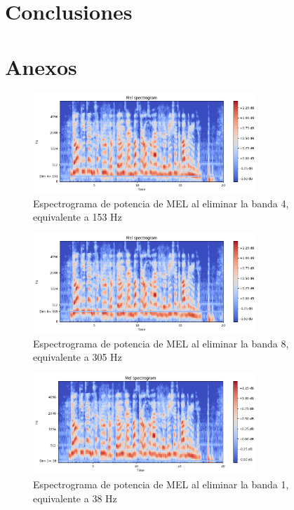 \documentclass[conference]{IEEEtran}
\begin{document}
\section{Conclusiones} \label{8-Conclusions}

\printbibliography

\section{Anexos} \label{9-Anexos}
\begin{figure}[h]
\centering
\includegraphics[width=0.75\textwidth]{images/dim_4_erasured.png}
\caption{Espectrograma de potencia de MEL al eliminar la banda 4, equivalente a 153 Hz}
\end{figure}

\begin{figure}[h]
\centering
\includegraphics[width=0.75\textwidth]{images/dim_8_erasured.png}
\caption{Espectrograma de potencia de MEL al eliminar la banda 8, equivalente a 305 Hz}
\end{figure}

\begin{figure}[h]
\centering
\includegraphics[width=0.75\textwidth]{images/dim_1_erasured.png}
\caption{Espectrograma de potencia de MEL al eliminar la banda 1, equivalente a 38 Hz}
\end{figure}
\end{document}
